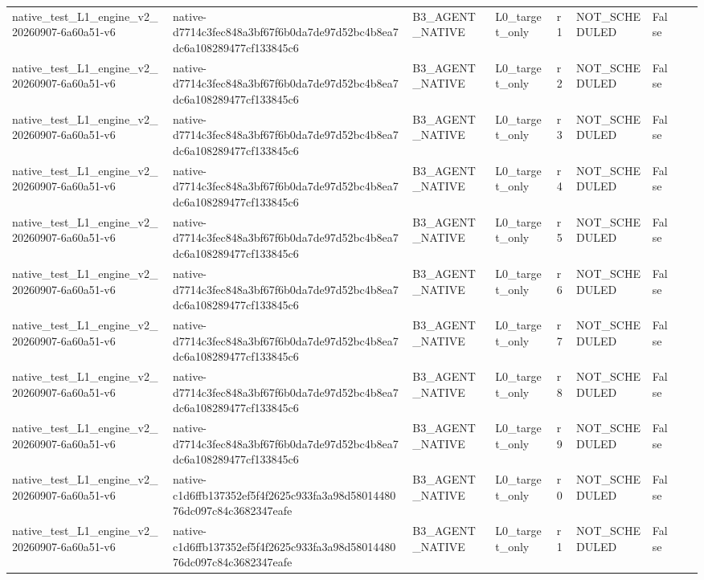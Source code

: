 \begin{tabular}{lllllllll}
native\_test\_L1\_engine\_v2\_20260907-6a60a51-v6 & native-d7714c3fec848a3bf67f6b0da7de97d52bc4b8ea7dc6a108289477cf133845c6 & B3\_AGENT\_NATIVE & L0\_target\_only & r1 & NOT\_SCHEDULED & False &  &  \\
native\_test\_L1\_engine\_v2\_20260907-6a60a51-v6 & native-d7714c3fec848a3bf67f6b0da7de97d52bc4b8ea7dc6a108289477cf133845c6 & B3\_AGENT\_NATIVE & L0\_target\_only & r2 & NOT\_SCHEDULED & False &  &  \\
native\_test\_L1\_engine\_v2\_20260907-6a60a51-v6 & native-d7714c3fec848a3bf67f6b0da7de97d52bc4b8ea7dc6a108289477cf133845c6 & B3\_AGENT\_NATIVE & L0\_target\_only & r3 & NOT\_SCHEDULED & False &  &  \\
native\_test\_L1\_engine\_v2\_20260907-6a60a51-v6 & native-d7714c3fec848a3bf67f6b0da7de97d52bc4b8ea7dc6a108289477cf133845c6 & B3\_AGENT\_NATIVE & L0\_target\_only & r4 & NOT\_SCHEDULED & False &  &  \\
native\_test\_L1\_engine\_v2\_20260907-6a60a51-v6 & native-d7714c3fec848a3bf67f6b0da7de97d52bc4b8ea7dc6a108289477cf133845c6 & B3\_AGENT\_NATIVE & L0\_target\_only & r5 & NOT\_SCHEDULED & False &  &  \\
native\_test\_L1\_engine\_v2\_20260907-6a60a51-v6 & native-d7714c3fec848a3bf67f6b0da7de97d52bc4b8ea7dc6a108289477cf133845c6 & B3\_AGENT\_NATIVE & L0\_target\_only & r6 & NOT\_SCHEDULED & False &  &  \\
native\_test\_L1\_engine\_v2\_20260907-6a60a51-v6 & native-d7714c3fec848a3bf67f6b0da7de97d52bc4b8ea7dc6a108289477cf133845c6 & B3\_AGENT\_NATIVE & L0\_target\_only & r7 & NOT\_SCHEDULED & False &  &  \\
native\_test\_L1\_engine\_v2\_20260907-6a60a51-v6 & native-d7714c3fec848a3bf67f6b0da7de97d52bc4b8ea7dc6a108289477cf133845c6 & B3\_AGENT\_NATIVE & L0\_target\_only & r8 & NOT\_SCHEDULED & False &  &  \\
native\_test\_L1\_engine\_v2\_20260907-6a60a51-v6 & native-d7714c3fec848a3bf67f6b0da7de97d52bc4b8ea7dc6a108289477cf133845c6 & B3\_AGENT\_NATIVE & L0\_target\_only & r9 & NOT\_SCHEDULED & False &  &  \\
native\_test\_L1\_engine\_v2\_20260907-6a60a51-v6 & native-c1d6ffb137352ef5f4f2625c933fa3a98d5801448076dc097c84c3682347eafe & B3\_AGENT\_NATIVE & L0\_target\_only & r0 & NOT\_SCHEDULED & False &  &  \\
native\_test\_L1\_engine\_v2\_20260907-6a60a51-v6 & native-c1d6ffb137352ef5f4f2625c933fa3a98d5801448076dc097c84c3682347eafe & B3\_AGENT\_NATIVE & L0\_target\_only & r1 & NOT\_SCHEDULED & False &  &  \\

\end{tabular}
